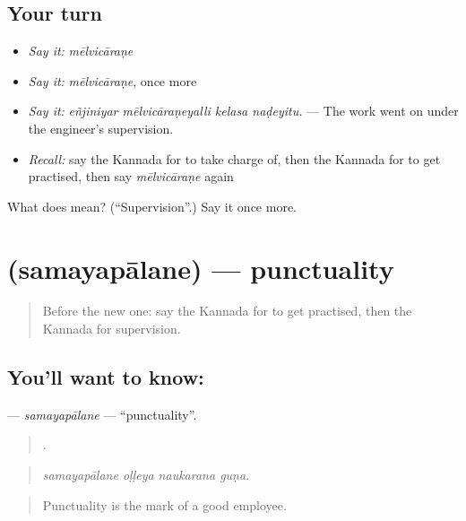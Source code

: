 \subsection*{Your turn}
\begin{itemize}
\raggedright
  \item \emph{Say it:} \emph{mēlvicāraṇe}
  \item \emph{Say it:} \emph{mēlvicāraṇe}, once more
  \item \emph{Say it:} \emph{eñjiniyar mēlvicāraṇeyalli kelasa naḍeyitu.} — The work went on under the engineer's supervision.
  \item \emph{Recall:} say the Kannada for to take charge of, then the Kannada for to get practised, then say \emph{mēlvicāraṇe} again
\end{itemize}

\begin{tcolorbox}[breakable,colback=teal!4,colframe=teal!35!black,title={Before you move on}]
What does  mean? (\textquotedblleft{}Supervision\textquotedblright{}.) Say it once more.
\end{tcolorbox}
\section[\texorpdfstring{\kn{ಸಮಯಪಾಲನೆ} (samayapālane)}{ಸಮಯಪಾಲನೆ (samayapālane)}]{ (samayapālane) — punctuality}

\label{lesson:KA-C520-samayapalane}



\begin{quote}
Before the new one: say the Kannada for to get practised, then the Kannada for supervision.
\end{quote}

\subsection*{You'll want to know: }
\textbf{} — \emph{samayapālane} — \textquotedblleft{}punctuality\textquotedblright{}.

\begin{quote}
   .
\end{quote}

\begin{quote}
\emph{samayapālane oḷḷeya naukarana guṇa.}
\end{quote}

\begin{quote}
Punctuality is the mark of a good employee.
\end{quote}

